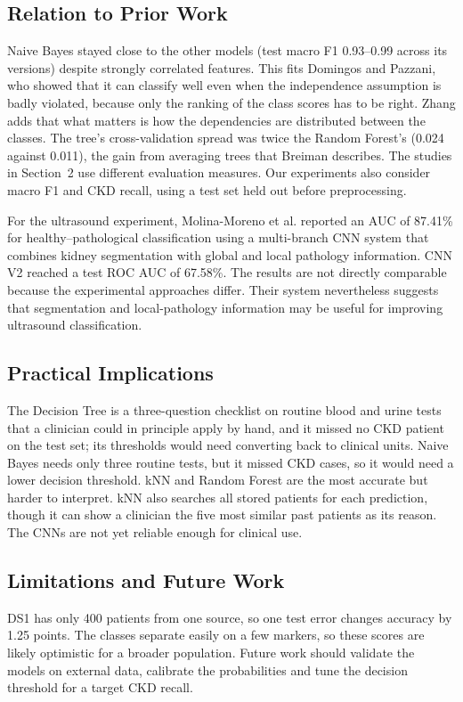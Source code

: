 \subsection{Relation to Prior Work}
Naive Bayes stayed close to the other models (test macro F1 0.93--0.99 across its versions) despite strongly correlated features. This fits Domingos and Pazzani,\cite{domingos1997} who showed that it can classify well even when the independence assumption is badly violated, because only the ranking of the class scores has to be right. Zhang\cite{zhang2004} adds that what matters is how the dependencies are distributed between the classes. The tree's cross-validation spread was twice the Random Forest's (0.024 against 0.011), the gain from averaging trees that Breiman describes.\cite{breiman2001} The studies in Section~2\cite{polat2017,qin2020} use different evaluation measures. Our experiments also consider macro F1 and CKD recall, using a test set held out before preprocessing.

For the ultrasound experiment, Molina-Moreno et al.\cite{uricad2024} reported an AUC of 87.41\% for healthy--pathological classification using a multi-branch CNN system that combines kidney segmentation with global and local pathology information. CNN V2 reached a test ROC AUC of 67.58\%. The results are not directly comparable because the experimental approaches differ. Their system nevertheless suggests that segmentation and local-pathology information may be useful for improving ultrasound classification.

\subsection{Practical Implications}
The Decision Tree is a three-question checklist on routine blood and urine tests that a clinician could in principle apply by hand, and it missed no CKD patient on the test set; its thresholds would need converting back to clinical units. Naive Bayes needs only three routine tests, but it missed CKD cases, so it would need a lower decision threshold. kNN and Random Forest are the most accurate but harder to interpret. kNN also searches all stored patients for each prediction, though it can show a clinician the five most similar past patients as its reason. The CNNs are not yet reliable enough for clinical use.

\subsection{Limitations and Future Work}
DS1 has only 400 patients from one source, so one test error changes accuracy by 1.25 points. The classes separate easily on a few markers, so these scores are likely optimistic for a broader population. Future work should validate the models on external data, calibrate the probabilities and tune the decision threshold for a target CKD recall.

